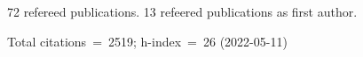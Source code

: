 72 refereed publications. 13 refeered publications as first author.

Total citations~=~2519; h-index~=~26 (2022-05-11)